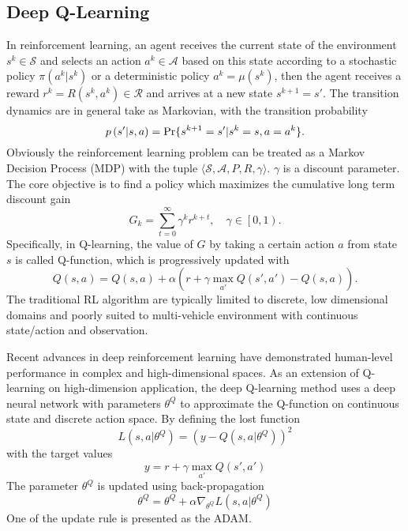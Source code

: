 \documentclass[letterpaper,10 pt,conference]{ieeeconf}
\begin{document}
\subsection{Deep Q-Learning}
In reinforcement learning, an agent receives the current state of the environment $s^k\in \mathcal{S}$ and selects an action $a^k\in \mathcal{A}$ based on this state according to a stochastic policy $\pi\left(a^k|s^k\right)$ or a deterministic policy $a^k = \mu\left(s^k\right)$, then the agent receives a reward $r^k = R\left(s^k,a^k\right) \in \mathcal{R}$ and arrives at a new state $s^{k+1} = s'$. 
The transition dynamics are in general take as Markovian, with the transition probability
\begin{equation}
p\left(s'|s,a\right) = {\rm{Pr}}\{s^{k+1}=s'|s^k= s,a = a^k \}.
\end{equation} 
Obviously the reinforcement learning problem can be treated as a Markov Decision Process (MDP) with the tuple $\langle\mathcal{S},\mathcal{A},P, R,\gamma\rangle$. $\gamma$ is a discount parameter.
The core objective is to find a policy which maximizes the cumulative long term discount gain 
\begin{equation}
\label{obje}
G_k = \sum\limits_{t=0}^{\infty}\gamma^k r^{k+t}, \quad \gamma \in \left[0,1\right).
\end{equation}
Specifically, in Q-learning, the value of $G$ by taking a certain action $a$ from state $s$ is called Q-function, which is progressively updated with 
\begin{equation}
Q\left(s,a\right) = Q\left(s,a\right) + \alpha \left(r+ \gamma \max\limits_{a'}Q\left(s',a'\right) - Q\left(s,a\right) \right).
\end{equation}
The traditional RL algorithm are typically limited to discrete, low dimensional domains and poorly suited to multi-vehicle environment with continuous state/action and observation. 

Recent advances in deep reinforcement learning  \cite{Mnih2015Human} have demonstrated human-level performance in complex and high-dimensional spaces. As an extension of Q-learning on high-dimension application, the deep Q-learning method uses a deep neural network with parameters $\theta^Q$ to approximate the Q-function on continuous state and discrete action space.
By defining the lost function 
\begin{equation}
\label{lost}
L\left(s,a|\theta^Q\right) = \left(y-Q\left(s,a|\theta^Q\right)\right)^2
\end{equation}
with the target values
\begin{equation}
y = r+ \gamma \max\limits_{a'}Q\left(s',a'\right)
\end{equation}
The parameter $\theta^Q$ is updated using back-propagation
\begin{equation}
\theta^Q = \theta^Q + \alpha \nabla_{\theta^Q}L\left(s,a|\theta^Q\right)
\end{equation}
One of the update rule is presented as the ADAM\cite{Kingma2014Adam}.
\end{document}
